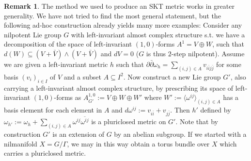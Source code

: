 \documentclass[12pt,reqno]{amsart}
\theoremstyle{definition}
\newtheorem{rem}[thm]{Remark}
\newcommand{\del}{\partial}
\newcommand{\delbar}{\bar{\del}}
\begin{document}
\begin{rem}
The method we used to produce an SKT metric works in greater generality. We have not tried to find the most general statement, but the following ad-hoc construction already yields many more examples: Consider any nilpotent Lie group $G$ with left-invariant almost complex structure s.t. we have a decomposition of the space of left-invariant $(1,0)$-forms $A^1=V\oplus W$, such that $d(W)\subseteq (V+\bar V)\wedge (V+\bar V)$ and $dV=0$ ($G$ is thus $2$-step nilpotent). Assume we are given a left-invariant metric $h$ such that $\del\delbar\omega_h=\sum_{(i,j)\in A}v_{i\bar{i}j\bar{j}}$ for some basis $(v_i)_{i\in I}$ of $V$ and a subset $A\subseteq I^2$. Now construct a new Lie group $G'$, also carrying a left-invariant almost complex structure, by prescribing its space of left-invariant $(1,0)$-forms as $A^{1,0}_{G'}:=V\oplus W\oplus W'$ where $W':=\langle \omega^{ij}\rangle_{(i,j)\in A}$ has a basis element for each element in $A$ and $d\omega^{ij}:=v_{i\bar{i}}+v_{j\bar{j}}$. Then $h'$ defined by $\omega_{h'}:=\omega_h+\sum_{(i,j)\in A} \omega^{ij}\overline{\omega^{ij}}$ is a pluriclosed metric on $G'$. Note that by construction $G'$ is an extension of $G$ by an abelian subgroup. If we started with a nilmanifold $X=G/\Gamma$, we may in this way obtain a torus bundle over $X$ which carries a pluriclosed metric. 
\end{rem}



\end{document}
